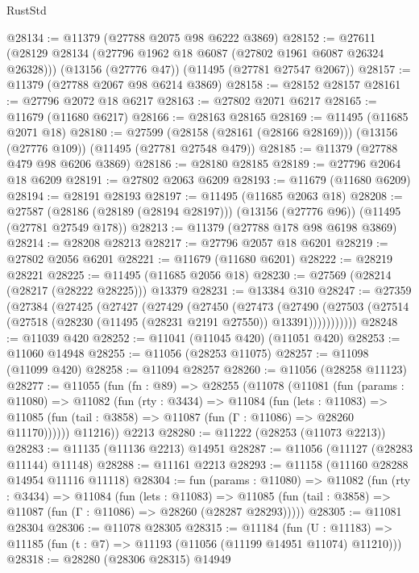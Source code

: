 \begin{lexlean}{RustStd}
\begin{coremodule}
@28134 := @11379 (@27788 @2075 @98 @6222 @3869)
@28152 := @27611
    (@28129 @28134 (@27796 @1962 @18 @6087 (@27802 @1961 @6087 @26324 @26328)))
    (@13156 (@27776 @47))
    (@11495 (@27781 @27547 @2067))
@28157 := @11379 (@27788 @2067 @98 @6214 @3869)
@28158 := @28152 @28157
@28161 := @27796 @2072 @18 @6217
@28163 := @27802 @2071 @6217
@28165 := @11679 (@11680 @6217)
@28166 := @28163 @28165
@28169 := @11495 (@11685 @2071 @18)
@28180 := @27599
    (@28158 (@28161 (@28166 @28169)))
    (@13156 (@27776 @109))
    (@11495 (@27781 @27548 @479))
@28185 := @11379 (@27788 @479 @98 @6206 @3869)
@28186 := @28180 @28185
@28189 := @27796 @2064 @18 @6209
@28191 := @27802 @2063 @6209
@28193 := @11679 (@11680 @6209)
@28194 := @28191 @28193
@28197 := @11495 (@11685 @2063 @18)
@28208 := @27587
    (@28186 (@28189 (@28194 @28197)))
    (@13156 (@27776 @96))
    (@11495 (@27781 @27549 @178))
@28213 := @11379 (@27788 @178 @98 @6198 @3869)
@28214 := @28208 @28213
@28217 := @27796 @2057 @18 @6201
@28219 := @27802 @2056 @6201
@28221 := @11679 (@11680 @6201)
@28222 := @28219 @28221
@28225 := @11495 (@11685 @2056 @18)
@28230 := @27569 (@28214 (@28217 (@28222 @28225))) @13379
@28231 := @13384 @310
@28247 := @27359
    (@27384
      (@27425
        (@27427
          (@27429
            (@27450
              (@27473
                (@27490
                  (@27503 (@27514 (@27518 (@28230 (@11495 (@28231 @2191 @27550)) @13391)))))))))))
@28248 := @11039 @420
@28252 := @11041 (@11045 @420) (@11051 @420)
@28253 := @11060 @14948
@28255 := @11056 (@28253 @11075)
@28257 := @11098 (@11099 @420)
@28258 := @11094 @28257
@28260 := @11056 (@28258 @11123)
@28277 := @11055
    (fun (fn : @89) =>
    @28255
      (@11078
        (@11081
          (fun (params : @11080) =>
          @11082
            (fun (rty : @3434) =>
            @11084
              (fun (lets : @11083) =>
              @11085 (fun (tail : @3858) => @11087 (fun (Γ : @11086) => @28260 @11170))))))
        @11216))
    @2213
@28280 := @11222 (@28253 (@11073 @2213))
@28283 := @11135 (@11136 @2213) @14951
@28287 := @11056 (@11127 (@28283 @11144) @11148)
@28288 := @11161 @2213
@28293 := @11158 (@11160 @28288 @14954 @11116 @11118)
@28304 := fun (params : @11080) =>
  @11082
    (fun (rty : @3434) =>
    @11084
      (fun (lets : @11083) =>
      @11085 (fun (tail : @3858) => @11087 (fun (Γ : @11086) => @28260 (@28287 @28293)))))
@28305 := @11081 @28304
@28306 := @11078 @28305
@28315 := @11184
    (fun (U : @11183) => @11185 (fun (t : @7) => @11193 (@11056 (@11199 @14951 @11074) @11210)))
@28318 := @28280 (@28306 @28315) @14949

\end{coremodule}
\end{lexlean}

